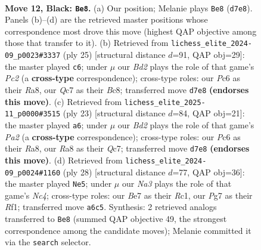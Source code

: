 \documentclass[11pt]{article}
\begin{document}
\begin{figure}[p]
\label{fig:thought-m21}
\end{figure}

\clearpage

\begin{figure}[p]\centering
\begin{subfigure}{0.46\textwidth}\centering
\resizebox{\linewidth}{!}{%
\newchessgame
\chessboard[
  setfen={r2r2k1/ppqbbppp/n1p1pn2/8/P1NP4/1P3PP1/4P1BP/RNBQR1K1 b - - 2 12},
  showmover=false,
  pgfstyle=straightmove, color=movearrow, markmove={d7-e8}
]}
\caption{}
\end{subfigure}\hfill
\begin{subfigure}{0.46\textwidth}\centering
\resizebox{\linewidth}{!}{%
\newchessgame
\chessboard[
  setfen={r1bq1rk1/ppp2pb1/5npn/3p3p/B2Pp3/4P2P/PPP2PP1/RNBQK1NR b KQ - 2 13},
  showmover=false,
  pgfstyle=straightmove, color=movearrow, markmove={c7-c6}
]}
\caption{}
\end{subfigure}
\\[4pt]
\begin{subfigure}{0.46\textwidth}\centering
\resizebox{\linewidth}{!}{%
\newchessgame
\chessboard[
  setfen={r4rk1/ppq2ppp/2n1pn2/2bp4/P7/2PBP2P/1P1NQPP1/R1B2RK1 b - - 1 12},
  showmover=false,
  pgfstyle=straightmove, color=movearrow, markmove={a7-a6}
]}
\caption{}
\end{subfigure}\hfill
\begin{subfigure}{0.46\textwidth}\centering
\resizebox{\linewidth}{!}{%
\newchessgame
\chessboard[
  setfen={r1br2k1/ppb1qpp1/2p1pn1p/8/2NP4/2N1P1P1/PPQ1BP1P/2R2RK1 w - - 1 15},
  showmover=false,
  pgfstyle=straightmove, color=movearrow, markmove={c4-e5}
]}
\caption{}
\end{subfigure}
\caption{\textbf{Move 12, Black: \texttt{Be8}.} (a) Our position; Melanie plays \texttt{Be8} (\texttt{d7e8}). Panels (b)--(d) are the retrieved master positions whose correspondence most drove this move (highest QAP objective among those that transfer to it). (b) Retrieved from \texttt{lichess\_elite\_2024-09\_p0023\#3337} (ply 25) [structural distance $d$=91, QAP obj=29]: the master played \texttt{c6}; under $\mu$ our \emph{Bd2} plays the role of that game's \emph{Pc2} (a \textbf{cross-type} correspondence); cross-type roles: our \emph{P}c6 as their \emph{R}a8, our \emph{Q}c7 as their \emph{B}c8; transferred move \texttt{d7e8} \textbf{(endorses this move)}. (c) Retrieved from \texttt{lichess\_elite\_2025-11\_p0000\#3515} (ply 23) [structural distance $d$=84, QAP obj=21]: the master played \texttt{a6}; under $\mu$ our \emph{Bd2} plays the role of that game's \emph{Pa2} (a \textbf{cross-type} correspondence); cross-type roles: our \emph{P}c6 as their \emph{R}a8, our \emph{R}a8 as their \emph{Q}c7; transferred move \texttt{d7e8} \textbf{(endorses this move)}. (d) Retrieved from \texttt{lichess\_elite\_2024-09\_p0024\#1160} (ply 28) [structural distance $d$=77, QAP obj=36]: the master played \texttt{Ne5}; under $\mu$ our \emph{Na3} plays the role of that game's \emph{Nc4}; cross-type roles: our \emph{B}e7 as their \emph{R}c1, our \emph{P}g7 as their \emph{R}f1; transferred move \texttt{a6c5}. Synthesis: 2 retrieved analogs transferred to \texttt{Be8} (summed QAP objective 49, the strongest correspondence among the candidate moves); Melanie committed it via the \texttt{search} selector.}

\end{figure}
\end{document}

